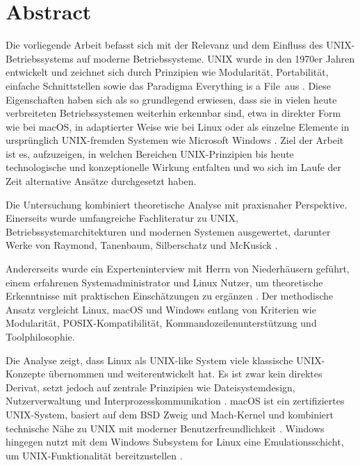 
\section{Abstract}

Die vorliegende Arbeit befasst sich mit der Relevanz und dem Einfluss des UNIX-Betriebssystems auf moderne Betriebssysteme. UNIX wurde in den 1970er Jahren
entwickelt und zeichnet sich durch Prinzipien wie Modularität, Portabilität, einfache Schnittstellen sowie das Paradigma \glqq Everything is a File\grqq \ aus
\cite{ArtOfUnixProgramming, ModernOS}. Diese Eigenschaften haben sich als so grundlegend erwiesen, dass sie in vielen heute verbreiteten
Betriebssystemen weiterhin erkennbar sind, etwa in direkter Form wie bei macOS, in adaptierter Weise wie bei Linux oder als einzelne Elemente in ursprünglich
UNIX-fremden Systemen wie Microsoft Windows \cite{ModernOS, WSL, OSConcept}. Ziel der Arbeit ist es, aufzuzeigen, in welchen Bereichen UNIX-Prinzipien bis
heute technologische und konzeptionelle Wirkung entfalten und wo sich im Laufe der Zeit alternative Ansätze durchgesetzt haben.

Die Untersuchung kombiniert theoretische Analyse mit praxisnaher Perspektive. Einerseits wurde umfangreiche Fachliteratur zu UNIX,
Betriebssystemarchitekturen und modernen Systemen ausgewertet, darunter Werke von Raymond, Tanenbaum, Silberschatz und McKusick
\cite{ArtOfUnixProgramming, ModernOS, FreeBSDOS, OSConcept}.

Andererseits wurde ein Experteninterview mit Herrn von Niederhäusern geführt, einem erfahrenen Systemadministrator und Linux Nutzer, um theoretische Erkenntnisse
mit praktischen Einschätzungen zu ergänzen \cite{interviewNH}. Der methodische Ansatz vergleicht Linux, macOS und Windows entlang von Kriterien wie Modularität,
POSIX-Kompatibilität, Kommandozeilenunterstützung und Toolphilosophie.

Die Analyse zeigt, dass Linux als UNIX-like System viele klassische UNIX-Konzepte übernommen und weiterentwickelt hat. Es ist zwar kein direktes
Derivat, setzt jedoch auf zentrale Prinzipien wie Dateisystemdesign, Nutzerverwaltung und Interprozesskommunikation \cite{ModernOS, OSConcept}. macOS ist ein
zertifiziertes UNIX-System, basiert auf dem BSD Zweig und Mach-Kernel und kombiniert technische Nähe zu UNIX mit moderner Benutzerfreundlichkeit
\cite{FreeBSDOS, OSConcept}. Windows hingegen nutzt mit dem Windows Subsystem for Linux eine Emulationsschicht, um UNIX-Funktionalität bereitzustellen
\cite{WSL, interviewNH}.

